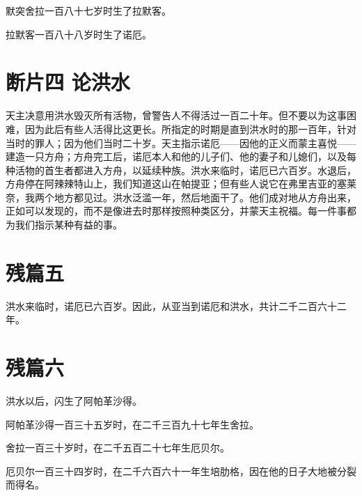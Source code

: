 默突舍拉一百八十七岁时生了拉默客。\par

拉默客一百八十八岁时生了诺厄。\par


\section{断片四 论洪水}

天主决意用洪水毁灭所有活物，曾警告人不得活过一百二十年。但不要以为这事困难，因为此后有些人活得比这更长。所指定的时期是直到洪水时的那一百年，针对当时的罪人；因为他们当时二十岁。天主指示诺厄——因他的正义而蒙主喜悦——建造一只方舟；方舟完工后，诺厄本人和他的儿子们、他的妻子和儿媳们，以及每种活物的首生者都进入方舟，以延续种族。洪水来临时，诺厄已六百岁。水退后，方舟停在阿辣辣特山上，我们知道这山在帕提亚；但有些人说它在弗里吉亚的塞莱奈，我两个地方都见过。洪水泛滥一年，然后地面干了。他们成对地从方舟出来，正如可以发现的，而不是像进去时那样按照种类区分，并蒙天主祝福。每一件事都为我们指示某种有益的事。\par


\section{残篇五}

洪水来临时，诺厄已六百岁。因此，从亚当到诺厄和洪水，共计二千二百六十二年。\par


\section{残篇六}

洪水以后，闪生了阿帕革沙得。\par

阿帕革沙得一百三十五岁时，在二千三百九十七年生舍拉。\par

舍拉一百三十岁时，在二千五百二十七年生厄贝尔。\par

厄贝尔一百三十四岁时，在二千六百六十一年生培肋格，因在他的日子大地被分裂而得名。\par

